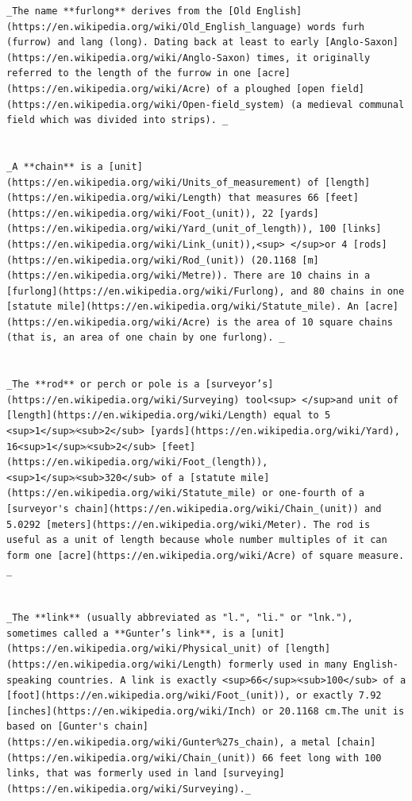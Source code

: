 \documentclass[
  12pt,
]{book}
\begin{document}
\begin{verbatim}
_The name **furlong** derives from the [Old English](https://en.wikipedia.org/wiki/Old_English_language) words furh (furrow) and lang (long). Dating back at least to early [Anglo-Saxon](https://en.wikipedia.org/wiki/Anglo-Saxon) times, it originally referred to the length of the furrow in one [acre](https://en.wikipedia.org/wiki/Acre) of a ploughed [open field](https://en.wikipedia.org/wiki/Open-field_system) (a medieval communal field which was divided into strips). _


_A **chain** is a [unit](https://en.wikipedia.org/wiki/Units_of_measurement) of [length](https://en.wikipedia.org/wiki/Length) that measures 66 [feet](https://en.wikipedia.org/wiki/Foot_(unit)), 22 [yards](https://en.wikipedia.org/wiki/Yard_(unit_of_length)), 100 [links](https://en.wikipedia.org/wiki/Link_(unit)),<sup> </sup>or 4 [rods](https://en.wikipedia.org/wiki/Rod_(unit)) (20.1168 [m](https://en.wikipedia.org/wiki/Metre)). There are 10 chains in a [furlong](https://en.wikipedia.org/wiki/Furlong), and 80 chains in one [statute mile](https://en.wikipedia.org/wiki/Statute_mile). An [acre](https://en.wikipedia.org/wiki/Acre) is the area of 10 square chains (that is, an area of one chain by one furlong). _


_The **rod** or perch or pole is a [surveyor’s](https://en.wikipedia.org/wiki/Surveying) tool<sup> </sup>and unit of [length](https://en.wikipedia.org/wiki/Length) equal to ​5 <sup>1</sup>⁄<sub>2</sub> [yards](https://en.wikipedia.org/wiki/Yard), 16​<sup>1</sup>⁄<sub>2</sub> [feet](https://en.wikipedia.org/wiki/Foot_(length)), ​<sup>1</sup>⁄<sub>320</sub> of a [statute mile](https://en.wikipedia.org/wiki/Statute_mile) or one-fourth of a [surveyor's chain](https://en.wikipedia.org/wiki/Chain_(unit)) and 5.0292 [meters](https://en.wikipedia.org/wiki/Meter). The rod is useful as a unit of length because whole number multiples of it can form one [acre](https://en.wikipedia.org/wiki/Acre) of square measure. _


_The **link** (usually abbreviated as "l.", "li." or "lnk."), sometimes called a **Gunter’s link**, is a [unit](https://en.wikipedia.org/wiki/Physical_unit) of [length](https://en.wikipedia.org/wiki/Length) formerly used in many English-speaking countries. A link is exactly ​<sup>66</sup>⁄<sub>100</sub> of a [foot](https://en.wikipedia.org/wiki/Foot_(unit)), or exactly 7.92 [inches](https://en.wikipedia.org/wiki/Inch) or 20.1168 cm.The unit is based on [Gunter's chain](https://en.wikipedia.org/wiki/Gunter%27s_chain), a metal [chain](https://en.wikipedia.org/wiki/Chain_(unit)) 66 feet long with 100 links, that was formerly used in land [surveying](https://en.wikipedia.org/wiki/Surveying)._
\end{verbatim}
\end{document}
